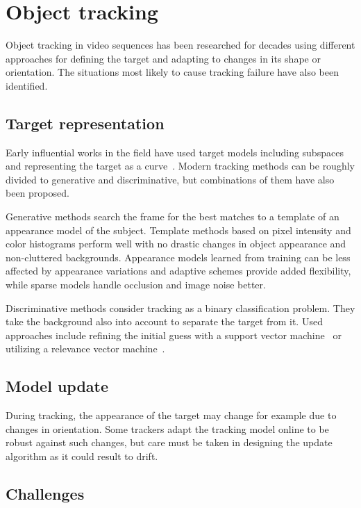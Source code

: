 \section{Object tracking}
Object tracking in video sequences has been researched for decades using different
approaches for defining the target and adapting to changes in its shape or orientation.
The situations most likely to cause tracking failure have also been identified.

\subsection{Target representation}
Early influential works in the field have used target models including subspaces
~\cite{EIGENTRACK} and representing the target as a curve~\cite{CONDENSATION}. Modern
tracking methods can be roughly divided to generative and discriminative, but combinations
of them have also been proposed. 

Generative methods search the frame for the best matches to a template of an appearance
model of the subject. Template methods based on pixel intensity and color histograms
perform well with no drastic changes in object appearance and non-cluttered backgrounds.
Appearance models learned from training can be less affected by appearance variations
and adaptive schemes provide added flexibility, while sparse models handle occlusion
and image noise better.~\cite{OBJECT_PLS}

Discriminative methods consider tracking as a binary classification problem. They take
the background also into account to separate the target from it. Used approaches
include refining the initial guess with a support vector machine~\cite{SVT} or utilizing
a relevance vector machine~\cite{SPARSE_BAYESIAN}.

\subsection{Model update}
During tracking, the appearance of the target may change for example due to changes in
orientation. Some trackers adapt the tracking model online to be robust against such
changes, but care must be taken in designing the update algorithm as it could result
to drift.

\subsection{Challenges}

